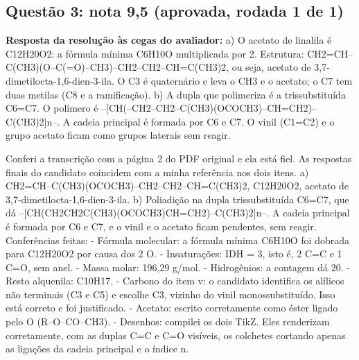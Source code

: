 \documentclass{article}%
\begin{document}
\subsection*{Questão 3: nota 9,5 (aprovada, rodada 1 de 1)}%
\textbf{Resposta da resolução às cegas do avaliador:} a) O acetato de linalila é C12H20O2: a fórmula mínima C6H10O multiplicada por 2. Estrutura: CH2=CH--C(CH3)(O--C(=O)--CH3)--CH2--CH2--CH=C(CH3)2, ou seja, acetato de 3,7{-}dimetilocta{-}1,6{-}dien{-}3{-}ila. O C3 é quaternário e leva o CH3 e o acetato; o C7 tem duas metilas (C8 e a ramificação).\newline%
b) A dupla que polimeriza é a trissubstituída C6=C7. O polímero é --{[}CH(--CH2--CH2--C(CH3)(OCOCH3)--CH=CH2)--C(CH3)2{]}n--. A cadeia principal é formada por C6 e C7. O vinil (C1=C2) e o grupo acetato ficam como grupos laterais sem reagir.\par %
Conferi a transcrição com a página 2 do PDF original e ela está fiel. As respostas finais do candidato coincidem com a minha referência nos dois itens.\newline%
\newline%
a) CH2=CH--C(CH3)(OCOCH3)--CH2--CH2--CH=C(CH3)2, C12H20O2, acetato de 3,7{-}dimetilocta{-}1,6{-}dien{-}3{-}ila.\newline%
\newline%
b) Poliadição na dupla trissubstituída C6=C7, que dá --{[}CH(CH2CH2C(CH3)(OCOCH3)CH=CH2)--C(CH3)2{]}n--. A cadeia principal é formada por C6 e C7, e o vinil e o acetato ficam pendentes, sem reagir.\newline%
\newline%
Conferências feitas:\newline%
{-} Fórmula molecular: a fórmula mínima C6H10O foi dobrada para C12H20O2 por causa dos 2 O.\newline%
{-} Insaturações: IDH = 3, isto é, 2 C=C e 1 C=O, sem anel.\newline%
{-} Massa molar: 196,29 g/mol.\newline%
{-} Hidrogênios: a contagem dá 20.\newline%
{-} Resto alquenila: C10H17.\newline%
{-} Carbono do item v: o candidato identifica os alílicos não terminais (C3 e C5) e escolhe C3, vizinho do vinil monossubstituído. Isso está correto e foi justificado.\newline%
{-} Acetato: escrito corretamente como éster ligado pelo O (R--O--CO--CH3).\newline%
{-} Desenhos: compilei os dois TikZ. Eles renderizam corretamente, com as duplas C=C e C=O visíveis, os colchetes cortando apenas as ligações da cadeia principal e o índice n.\newline%
\end{document}
